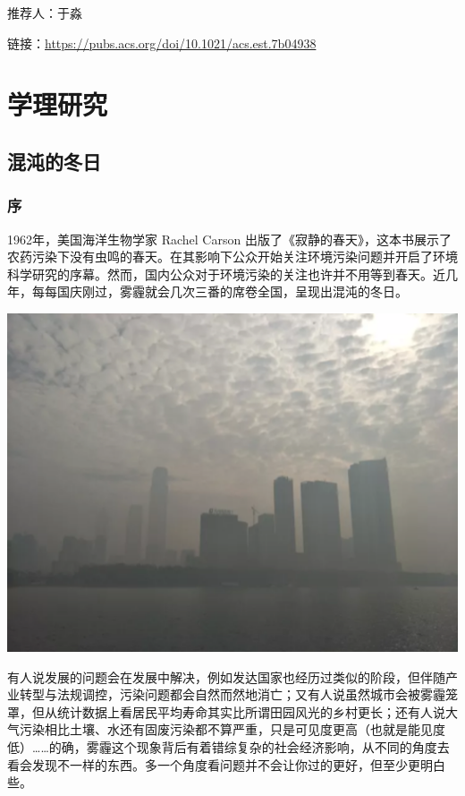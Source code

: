 \documentclass[]{book}
\begin{document}
推荐人：于淼

链接：\url{https://pubs.acs.org/doi/10.1021/acs.est.7b04938}

\chapter{学理研究}

\section{混沌的冬日}

\subsection{序}

1962年，美国海洋生物学家 Rachel Carson
出版了《寂静的春天》，这本书展示了农药污染下没有虫鸣的春天。在其影响下公众开始关注环境污染问题并开启了环境科学研究的序幕。然而，国内公众对于环境污染的关注也许并不用等到春天。近几年，每每国庆刚过，雾霾就会几次三番的席卷全国，呈现出混沌的冬日。

\includegraphics[width=6.67in]{images/cw1}

有人说发展的问题会在发展中解决，例如发达国家也经历过类似的阶段，但伴随产业转型与法规调控，污染问题都会自然而然地消亡；又有人说虽然城市会被雾霾笼罩，但从统计数据上看居民平均寿命其实比所谓田园风光的乡村更长；还有人说大气污染相比土壤、水还有固废污染都不算严重，只是可见度更高（也就是能见度低）\ldots{}\ldots{}的确，雾霾这个现象背后有着错综复杂的社会经济影响，从不同的角度去看会发现不一样的东西。多一个角度看问题并不会让你过的更好，但至少更明白些。
\end{document}
